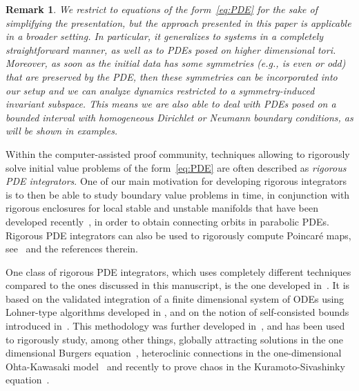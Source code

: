 \documentclass[10pt,a4paper]{article}
\theoremstyle{plain}
\newtheorem{remark}[theorem]{Remark}
\newcommand{\1}{\mathbf{1}}
\begin{document}
\begin{remark}
We restrict to equations of the form~\eqref{eq:PDE} for the sake of simplifying the presentation, but the approach presented in this paper is applicable in a broader setting. In particular, it generalizes to systems in a completely straightforward manner, as well as to PDEs posed on higher dimensional tori.
Moreover, as soon as the initial data has some symmetries (e.g., is even or odd) that are preserved by the PDE, then these symmetries can be incorporated into our setup and we can analyze dynamics restricted to a symmetry-induced invariant subspace. This means we are also able to deal with PDEs posed on a bounded interval with homogeneous Dirichlet or Neumann boundary conditions, as will be shown in examples. 
\end{remark}

Within the computer-assisted proof community, techniques allowing to rigorously solve initial value problems of the form~\eqref{eq:PDE} are often described as \emph{rigorous PDE integrators}. One of our main motivation for developing rigorous integrators is to then be able to study boundary value problems in time, in conjunction with rigorous enclosures for local stable and unstable manifolds that have been developed recently~\cite{MirRei19,BerJaqMir22}, in order to obtain connecting orbits in parabolic PDEs. Rigorous PDE integrators can also be used to rigorously compute Poincaré maps, see~\cite{CAPD} and the references therein.

One class of rigorous PDE integrators, which uses completely different techniques compared to the ones discussed in this manuscript, is the one developed in~\cite{Zgl04,Zgl10}. It is based on the validated integration of a finite dimensional system of ODEs using Lohner-type algorithms developed in 
\cite{Zgl02}, and on the notion of self-consisted bounds introduced in~\cite{ZglMis01}. This methodology was further developed in~\cite{Cyr14,WilZgl25}, and has been used to rigorously study, among other things, globally attracting solutions in the one dimensional Burgers equation~\cite{CyrZgl15}, heteroclinic connections in the one-dimensional Ohta-Kawasaki model~\cite{CyrWan18} and recently to prove chaos in the Kuramoto-Sivashinky equation~\cite{WilZgl20,WilZgl24}.
\end{document}
